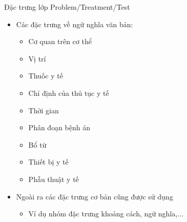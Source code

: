\begin{frame}{Đặc trưng lớp Problem/Treatment/Test}
\putlogo
\begin{itemize}
	\item Các đặc trưng về {\color{red} ngữ nghĩa} văn bản:
	\begin{itemize}
		\item Cơ quan trên cơ thể
		\item Vị trí
		\item Thuốc y tế
		\item Chỉ định của thủ tục y tế
		\item Thời gian
		\item Phân đoạn bệnh án
		\item Bổ từ
		\item Thiết bị y tế
		\item Phẫu thuật y tế
	\end{itemize}
	\item Ngoài ra các đặc trưng cơ bản cũng được sử dụng
	\begin{itemize}
		\item Ví dụ nhóm đặc trưng khoảng cách, ngữ nghĩa,...
	\end{itemize}
\end{itemize}
\end{frame}

